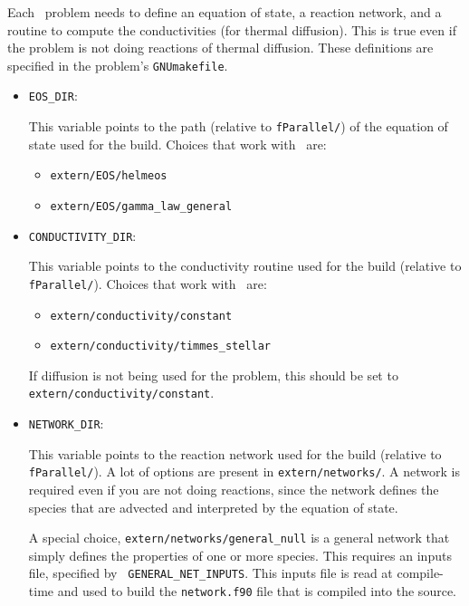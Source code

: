 Each \maestro\ problem needs to define an equation of state, a
reaction network, and a routine to compute the conductivities (for
thermal diffusion).  This is true even if the problem is not doing
reactions of thermal diffusion.  These definitions are specified
in the problem's {\tt GNUmakefile}.

\begin{itemize}
\item {\tt EOS\_DIR}:

  This variable points to the path (relative to {\tt fParallel/}) of
  the equation of state used for the build.  Choices that work
  with \maestro\ are:
  \begin{itemize}
  \item {\tt extern/EOS/helmeos}
  \item {\tt extern/EOS/gamma\_law\_general}
  \end{itemize}

\item {\tt CONDUCTIVITY\_DIR}:

  This variable points to the conductivity routine used for the build
  (relative to {\tt fParallel/}).  Choices that work with \maestro\
  are:
  \begin{itemize}
  \item {\tt extern/conductivity/constant}
  \item {\tt extern/conductivity/timmes\_stellar}
  \end{itemize}
  If diffusion is not being used for the problem, this should be set
  to {\tt extern/conductivity/constant}.

\item {\tt NETWORK\_DIR}:

  This variable points to the reaction network used for the build
  (relative to {\tt fParallel/}).  A lot of options are present in
  {\tt extern/networks/}.  A network is required even if you are not
  doing reactions, since the network defines the species that are
  advected and interpreted by the equation of state.  

  A special choice, {\tt extern/networks/general\_null} is a general
  network that simply defines the properties of one or more species.
  This requires an inputs file, specified by {\tt
  GENERAL\_NET\_INPUTS}.  This inputs file is read at compile-time and
  used to build the {\tt network.f90} file that is compiled into the
  source.

\end{itemize}


